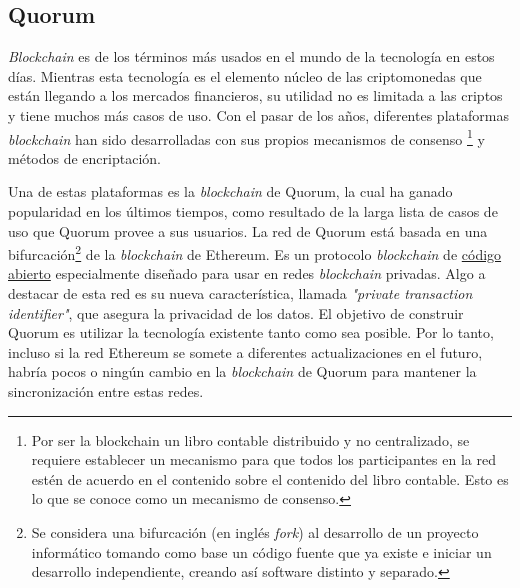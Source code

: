  \subsection{Quorum} \hspace*{}

    \textit{Blockchain} es de los términos más usados en el mundo de la tecnología en estos días. Mientras esta tecnología es el elemento núcleo 
    de las criptomonedas que están llegando a los mercados financieros, su utilidad no es limitada a las criptos y tiene muchos más casos 
    de uso. Con el pasar de los años, diferentes plataformas \textit{blockchain} han sido desarrolladas con sus propios mecanismos de consenso
    \footnote{Por ser la blockchain un libro contable distribuido y no centralizado, se requiere establecer un mecanismo para que todos 
    los participantes en la red estén de acuerdo en el contenido sobre el contenido del libro contable. Esto es lo que se conoce 
    como un mecanismo de consenso.} y 
    métodos de encriptación.

    Una de estas plataformas es la \textit{blockchain} de Quorum, la cual ha ganado popularidad en los últimos tiempos, como resultado de 
    la larga
    lista de casos de uso que Quorum provee a sus usuarios. La red de Quorum está basada en una bifurcación\footnote{Se considera una 
    bifurcación (en inglés \textit{fork}) al desarrollo de un proyecto informático tomando como base un código fuente que ya existe e 
    iniciar un desarrollo independiente, creando así software distinto y separado.} de la \textit{blockchain} de Ethereum.
    Es un protocolo \textit{blockchain} de \href{https://github.com/ConsenSys/quorum}{código abierto} especialmente diseñado para usar en redes 
    \textit{blockchain} privadas. Algo a destacar de esta red
    es su nueva característica, llamada \textit{"private transaction identifier"}, que asegura la privacidad de los datos. El objetivo de
    construir Quorum es utilizar la tecnología existente tanto como sea posible. Por lo tanto, incluso si la red Ethereum se somete a 
    diferentes actualizaciones en el futuro, habría pocos o ningún cambio en la \textit{blockchain} de Quorum para mantener la sincronización entre
    estas redes.


